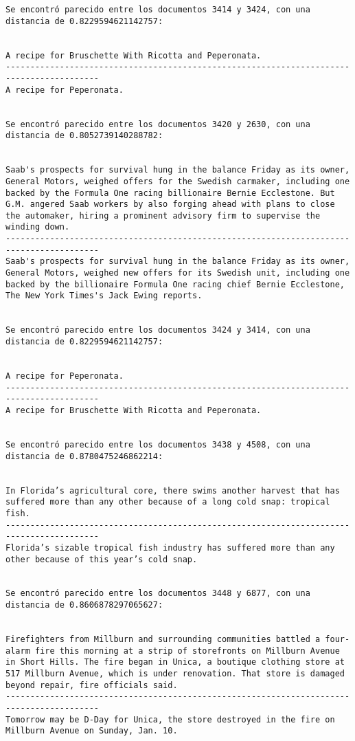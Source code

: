 \documentclass[11pt]{article}
\begin{document}
\begin{Verbatim}[commandchars=\\\{\}]
Se encontró parecido entre los documentos 3414 y 3424, con una distancia de 0.8229594621142757:


A recipe for Bruschette With Ricotta and Peperonata.
-----------------------------------------------------------------------------------------
A recipe for Peperonata.


Se encontró parecido entre los documentos 3420 y 2630, con una distancia de 0.8052739140288782:


Saab's prospects for survival hung in the balance Friday as its owner, General Motors, weighed offers for the Swedish carmaker, including one backed by the Formula One racing billionaire Bernie Ecclestone. But G.M. angered Saab workers by also forging ahead with plans to close the automaker, hiring a prominent advisory firm to supervise the winding down.
-----------------------------------------------------------------------------------------
Saab's prospects for survival hung in the balance Friday as its owner, General Motors, weighed new offers for its Swedish unit, including one backed by the billionaire Formula One racing chief Bernie Ecclestone, The New York Times's Jack Ewing reports.


Se encontró parecido entre los documentos 3424 y 3414, con una distancia de 0.8229594621142757:


A recipe for Peperonata.
-----------------------------------------------------------------------------------------
A recipe for Bruschette With Ricotta and Peperonata.


Se encontró parecido entre los documentos 3438 y 4508, con una distancia de 0.8780475246862214:


In Florida’s agricultural core, there swims another harvest that has suffered more than any other because of a long cold snap: tropical fish.
-----------------------------------------------------------------------------------------
Florida’s sizable tropical fish industry has suffered more than any other because of this year’s cold snap.


Se encontró parecido entre los documentos 3448 y 6877, con una distancia de 0.8606878297065627:


Firefighters from Millburn and surrounding communities battled a four-alarm fire this morning at a strip of storefronts on Millburn Avenue in Short Hills. The fire began in Unica, a boutique clothing store at 517 Millburn Avenue, which is under renovation. That store is damaged beyond repair, fire officials said.
-----------------------------------------------------------------------------------------
Tomorrow may be D-Day for Unica, the store destroyed in the fire on Millburn Avenue on Sunday, Jan. 10.



\end{Verbatim}
\end{document}
